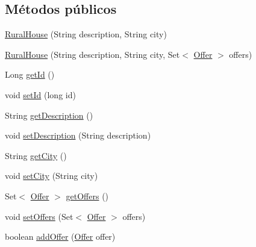 \subsection*{Métodos públicos}
\begin{DoxyCompactItemize}
\item 
\mbox{\hyperlink{classcom_1_1ruralhousejsf_1_1domain_1_1_rural_house_aa3488a4d0e876307f91f80784a5538a5}{Rural\+House}} (String description, String city)
\item 
\mbox{\hyperlink{classcom_1_1ruralhousejsf_1_1domain_1_1_rural_house_a7a4e2da81d0c806e058f446b4c657458}{Rural\+House}} (String description, String city, Set$<$ \mbox{\hyperlink{classcom_1_1ruralhousejsf_1_1domain_1_1_offer}{Offer}} $>$ offers)
\item 
Long \mbox{\hyperlink{classcom_1_1ruralhousejsf_1_1domain_1_1_rural_house_adae53723eac123b55f8122e89cdfe9c3}{get\+Id}} ()
\item 
void \mbox{\hyperlink{classcom_1_1ruralhousejsf_1_1domain_1_1_rural_house_aaea8ea8cb5cb886fb0b7e38bb7546472}{set\+Id}} (long id)
\item 
String \mbox{\hyperlink{classcom_1_1ruralhousejsf_1_1domain_1_1_rural_house_a3d4f77d4ff2e8ca9527bb86816dc1174}{get\+Description}} ()
\item 
void \mbox{\hyperlink{classcom_1_1ruralhousejsf_1_1domain_1_1_rural_house_ad4e39275d6996833e089c2013bfb9c4b}{set\+Description}} (String description)
\item 
String \mbox{\hyperlink{classcom_1_1ruralhousejsf_1_1domain_1_1_rural_house_acb17324965fdc86c270d1b2dc7624083}{get\+City}} ()
\item 
void \mbox{\hyperlink{classcom_1_1ruralhousejsf_1_1domain_1_1_rural_house_a329be3e41ca6f9e57a0fc887c066ad55}{set\+City}} (String city)
\item 
Set$<$ \mbox{\hyperlink{classcom_1_1ruralhousejsf_1_1domain_1_1_offer}{Offer}} $>$ \mbox{\hyperlink{classcom_1_1ruralhousejsf_1_1domain_1_1_rural_house_a8e5bd3ba4e562e0c1e57e762cdee9447}{get\+Offers}} ()
\item 
void \mbox{\hyperlink{classcom_1_1ruralhousejsf_1_1domain_1_1_rural_house_a6edffd501fd0be08f923be5a1615e1fb}{set\+Offers}} (Set$<$ \mbox{\hyperlink{classcom_1_1ruralhousejsf_1_1domain_1_1_offer}{Offer}} $>$ offers)
\item 
boolean \mbox{\hyperlink{classcom_1_1ruralhousejsf_1_1domain_1_1_rural_house_a42b59123f7f6ac871f5510bb19a98884}{add\+Offer}} (\mbox{\hyperlink{classcom_1_1ruralhousejsf_1_1domain_1_1_offer}{Offer}} offer)
\item 

\end{DoxyCompactItemize}

